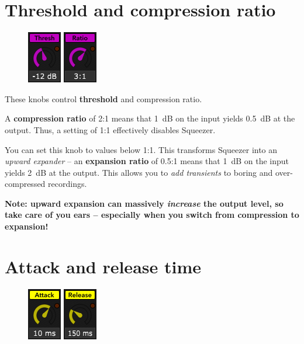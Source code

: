 \newpage %

\section{Threshold and compression ratio}

\begin{figure}
  \includegraphics[scale=\screenshotscale,clip]{include/images/knob_threshold.png}
  \includegraphics[scale=\screenshotscale,clip]{include/images/knob_compression_ratio.png}
\end{figure}

These knobs control \textbf{threshold} and compression ratio.

A \textbf{compression ratio} of 2:1 means that \SI{1}{\dB} on the
input yields \SI{0.5}{\dB} at the output.  Thus, a setting of 1:1
effectively disables Squeezer.

You can set this knob to values below 1:1.  This transforms Squeezer
into an \emph{upward expander} -- an \textbf{expansion ratio} of 0.5:1
means that \SI{1}{\dB} on the input yields \SI{2}{\dB} at the output.
This allows you to \emph{add transients} to boring and over-compressed
recordings.

\textbf{Note: upward expansion can massively \emph{increase} the
  output level, so take care of you ears -- especially when you switch
  from compression to expansion!}

\section{Attack and release time}

\begin{figure}
  \includegraphics[scale=\screenshotscale,clip]{include/images/knob_attack_time.png}
  \includegraphics[scale=\screenshotscale,clip]{include/images/knob_release_time.png}
\end{figure}

